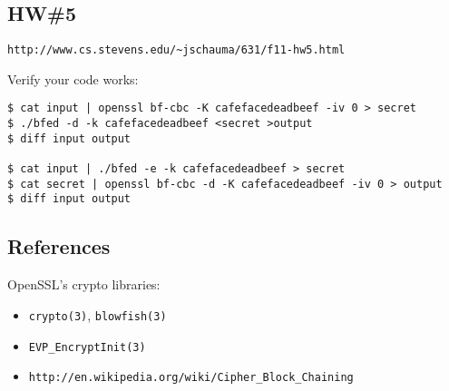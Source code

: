 \documentclass[xga]{xdvislides}
\begin{document}
\subsection{HW\#5}
\verb+http://www.cs.stevens.edu/~jschauma/631/f11-hw5.html+

Verify your code works:
\begin{verbatim}
$ cat input | openssl bf-cbc -K cafefacedeadbeef -iv 0 > secret
$ ./bfed -d -k cafefacedeadbeef <secret >output
$ diff input output

$ cat input | ./bfed -e -k cafefacedeadbeef > secret
$ cat secret | openssl bf-cbc -d -K cafefacedeadbeef -iv 0 > output
$ diff input output

\end{verbatim}


\subsection{References}
OpenSSL's crypto libraries:
\begin{itemize}
	\item {\tt crypto(3)}, {\tt blowfish(3)}
	\item {\tt EVP\_EncryptInit(3)}
	\item {\tt http://en.wikipedia.org/wiki/Cipher\_Block\_Chaining}
\end{itemize}
\end{document}
